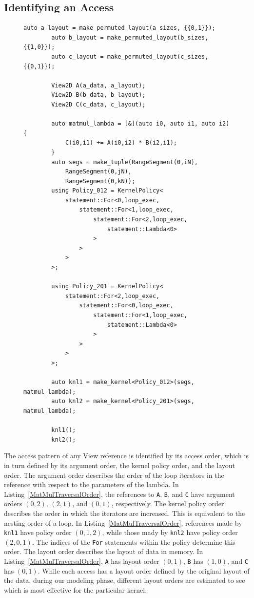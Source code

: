 \documentclass[sigconf]{acmart}
\begin{document}
\subsection{Identifying an Access}
\begin{figure}
	\begin{lstlisting}[caption={Two implementations of matrix multiplication using different kernel policies.},
		label={MatMulTraversalOrder}]
		auto a_layout = make_permuted_layout(a_sizes, {{0,1}});
		auto b_layout = make_permuted_layout(b_sizes, {{1,0}});
		auto c_layout = make_permuted_layout(c_sizes, {{0,1}});

		View2D A(a_data, a_layout);
		View2D B(b_data, b_layout);
		View2D C(c_data, c_layout);

		auto matmul_lambda = [&](auto i0, auto i1, auto i2) {
			C(i0,i1) += A(i0,i2) * B(i2,i1);
		}
		auto segs = make_tuple(RangeSegment(0,iN), 
			RangeSegment(0,jN), 
			RangeSegment(0,kN));
		using Policy_012 = KernelPolicy<
			statement::For<0,loop_exec,
				statement::For<1,loop_exec,
					statement::For<2,loop_exec,
						statement::Lambda<0>
					>
				>
			>
		>;

		using Policy_201 = KernelPolicy<
			statement::For<2,loop_exec,
				statement::For<0,loop_exec,
					statement::For<1,loop_exec,
						statement::Lambda<0>
					>
				>
			>
		>;

		auto knl1 = make_kernel<Policy_012>(segs, matmul_lambda);
		auto knl2 = make_kernel<Policy_201>(segs, matmul_lambda);

		knl1();
		knl2();
	\end{lstlisting}
\end{figure}

The access pattern of any View reference is identified by its access order, which is in turn defined by its argument order, the kernel policy order, and the layout order. 
The argument order describes the order of the loop iterators in the reference with respect to the parameters of the lambda. 
In Listing~\ref{MatMulTraversalOrder}, the references to \verb.A., \verb.B., and \verb.C. have argument orders $(0,2)$, $(2,1)$, and $(0,1)$, respectively. 
The kernel policy order describes the order in which the iterators are increased. 
This is equivalent to the nesting order of a loop.
In Listing~\ref{MatMulTraversalOrder}, references made by \verb.knl1. have policy order $(0,1,2)$, while those mady by \verb.knl2. have policy order $(2,0,1)$.
The indices of the \verb.For. statements within the policy determine this order.
The layout order describes the layout of data in memory. 
In Listing~\ref{MatMulTraversalOrder}, \verb.A. has layout order $(0,1)$, \verb.B. has $(1,0)$, and \verb.C. has $(0,1)$.
While each access has a layout order defined by the original layout of the data, during our modeling phase, different layout orders are estimated to see which is most effective for the particular kernel. 
\end{document}
